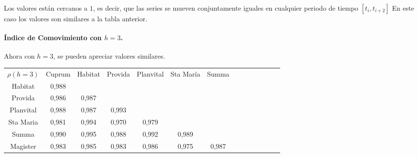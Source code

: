 Los valores est\'an cercanos a $1$, es decir, que las series se mueven conjuntamente iguales en cualquier periodo de tiempo $[t_i,t_{i+2}]$ En este caso los valores son similares a la tabla anterior.

\paragraph{\'Indice de Comovimiento con $h=3$.}

Ahora con $h=3$, se pueden apreciar valores similares.

\begin{center}
\begin{small}
\begin{tabular}{|l|l|l|l|l|l|l|lllllll}
\cline{1-7}
\multicolumn{1}{|c|}{$\rho(h=3)$} & \multicolumn{1}{c|}{Cuprum} & \multicolumn{1}{c|}{Habitat} & \multicolumn{1}{c|}{Provida} & \multicolumn{1}{c|}{Planvital} & \multicolumn{1}{c|}{Sta Mar\'ia} & \multicolumn{1}{c|}{Summa} &  &  &  &  &  &  &  \\
\cline{1-7}
\multicolumn{1}{|c|}{Habitat} & \multicolumn{1}{c|}{0,988} & \multicolumn{1}{c|}{} & \multicolumn{1}{c|}{} & \multicolumn{1}{c|}{} & \multicolumn{1}{c|}{} & \multicolumn{1}{c|}{} &  &  &  &  &  &  &  \\
\cline{1-7}
\multicolumn{1}{|c|}{Provida} & \multicolumn{1}{c|}{0,986} & \multicolumn{1}{c|}{0,987} & \multicolumn{1}{c|}{} & \multicolumn{1}{c|}{} & \multicolumn{1}{c|}{} & \multicolumn{1}{c|}{} &  &  &  &  &  &  &  \\
\cline{1-7}
\multicolumn{1}{|c|}{Planvital} & \multicolumn{1}{c|}{0,988} & \multicolumn{1}{c|}{0,987} & \multicolumn{1}{c|}{0,993} & \multicolumn{1}{c|}{} & \multicolumn{1}{c|}{} & \multicolumn{1}{c|}{} &  &  &  &  &  &  &  \\
\cline{1-7}
\multicolumn{1}{|c|}{Sta Maria} & \multicolumn{1}{c|}{0,981} & \multicolumn{1}{c|}{0,994} & \multicolumn{1}{c|}{0,970} & \multicolumn{1}{c|}{0,979} & \multicolumn{1}{c|}{} & \multicolumn{1}{c|}{} &  &  &  &  &  &  &  \\
\cline{1-7}
\multicolumn{1}{|c|}{Summa} & \multicolumn{1}{c|}{0,990} & \multicolumn{1}{c|}{0,995} & \multicolumn{1}{c|}{0,988} & \multicolumn{1}{c|}{0,992} & \multicolumn{1}{c|}{0,989} & \multicolumn{1}{c|}{} &  &  &  &  &  &  &  \\
\cline{1-7}
\multicolumn{1}{|c|}{Magister} & \multicolumn{1}{c|}{0,983} & \multicolumn{1}{c|}{0,985} & \multicolumn{1}{c|}{0,983} & \multicolumn{1}{c|}{0,986} & \multicolumn{1}{c|}{0,975} & \multicolumn{1}{c|}{0,987} &  &  &  &  &  &  &  \\
\cline{1-7}
\end{tabular}
\end{small}
\end{center}


